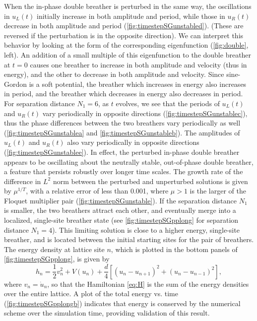 \documentclass[12pt,reqno]{amsart}
\theoremstyle{definition}
\begin{document}
When the in-phase double breather is perturbed in the same way, the oscillations in $u_L(t)$ initially increase in both amplitude and period, while those in $u_R(t)$ decrease in both amplitude and period (\cref{fig:timestepSGunstabled}). (These are reversed if the perturbation is in the opposite direction). We can interpret this behavior by looking at the form of the corresponding eigenfunction (\cref{fig:double}, left). An addition of a small multiple of this eigenfunction to the double breather at $t=0$ causes one breather to increase in both amplitude and velocity (thus in energy), and the other to decrease in both amplitude and velocity. Since sine-Gordon is a soft potential, the breather which increases in energy also increases in period, and the breather which decreases in energy also decreases in period.
For separation distance $N_1 = 6$, as $t$ evolves, we see that the periods of $u_L(t)$ and $u_R(t)$ vary periodically in opposite directions (\cref{fig:timestepSGunstablec}), thus the phase differences between the two breathers vary periodically as well (\cref{fig:timestepSGunstablea} and \cref{fig:timestepSGunstableb}). The amplitudes of $u_L(t)$ and $u_R(t)$ also vary periodically in opposite directions (\cref{fig:timestepSGunstablee}). In effect, the perturbed in-phase double breather appears to be oscillating about the neutrally stable, out-of-phase double breather, a feature
that persists robustly over longer time scales. The growth rate of the difference in $L^2$ norm between the perturbed and unperturbed solutions is given by $\mu^{1/T}$, with a relative error of less than 0.001, where $\mu > 1$ is the larger of the Floquet multiplier pair (\cref{fig:timestepSGunstable}). If the separation distance $N_1$ is smaller, the two breathers attract each other, and eventually merge into a localized, single-site breather state (see \cref{fig:timestepSGpplong} for separation distance $N_1 = 4$). 
This limiting solution is close to a higher energy, single-site breather, and is located between the initial starting sites for the pair of breathers. 
The energy density at lattice site $n$, which is plotted in the bottom panels of \cref{fig:timestepSGpplong}, is given by
\begin{equation}\label{eq:Hn}
h_n = \frac{1}{2}v_n^2 + V(u_n) 
+ \frac{d}{4}\left[ (u_n - u_{n+1})^2 + (u_n - u_{n-1})^2\right],
\end{equation}
where $v_n = \dot{u}_n$, so that the Hamiltonian \cref{eq:H} is the sum of the energy densities over the entire lattice. 
A plot of the total energy vs. time (\cref{fig:timestepSGpplongb}) indicates that energy is conserved by the numerical scheme over the simulation time, providing validation of this result.
\end{document}
